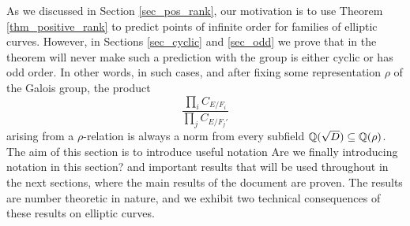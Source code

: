 As we discussed in Section \ref{sec_pos_rank}, our motivation is to use Theorem \ref*{thm_positive_rank} to predict points of infinite order for families of elliptic curves. However, in Sections \ref{sec_cyclic} and \ref{sec_odd} we prove that in the theorem will never make such a prediction with the group is either cyclic or has odd order. In other words, in such cases, and after fixing some representation $\rho$ of the Galois group, the product
\begin{equation}\label{eqn_localprod}
    \frac{\prod_i C_{E/F_i}}{\prod_j C_{E/F_j'}}
\end{equation}
arising from a $\rho$-relation is always a norm from every subfield $\mathbb{Q}(\sqrt{D})\subseteq\mathbb{Q}(\rho)$. The aim of this section is to introduce useful notation {\color{red} Are we finally introducing notation in this section?} and important results that will be used throughout in the next sections, where the main results of the document are proven. The results are number theoretic in nature, and we exhibit two technical consequences of these results on elliptic curves.





